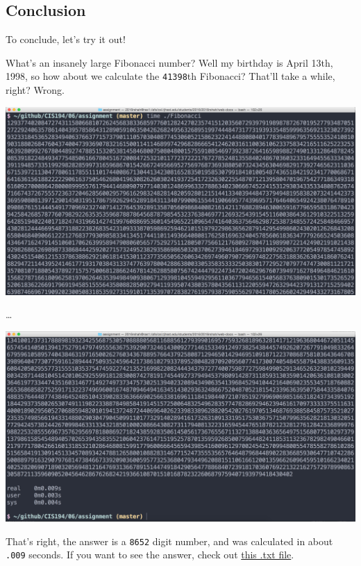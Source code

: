 \documentclass[12pt]{article}
\begin{document}
	\subsection{Conclusion}\label{conclusion}

	To conclude, let's try it out!

	What's an insanely large Fibonacci number? Well my birthday is April
	13th, 1998, so how about we calculate the \texttt{41398}th Fibonacci?
	That'll take a while, right? Wrong.


	\includegraphics[width=6in]{Fibonacci_ss_1}

	\ldots\newline{}

	\includegraphics[width=6in]{Fibonacci_ss_2}

	That's right, the answer is a \texttt{8652} digit number, and was
	calculated in about \texttt{.009} seconds. If you want to see the
	answer, check out \href{http://www.rshah.org/blog/resources/Fibonacci_answer.txt}{this .txt file}.
\end{document}
